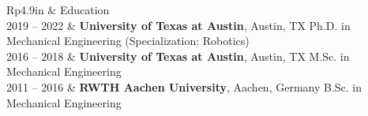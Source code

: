\documentclass[letterpaper, 11pt]{article}
\newcommand{\headingfont}{\Large\color{CustomBlue}}
\newenvironment{SectionTable}[1]{
	\renewcommand*{\arraystretch}{1.3} %
	\setlength{\tabcolsep}{10pt}
	\begin{longtable}{Rp{4.9in}} & #1 \\}
{\end{longtable}}
\begin{document}

\begin{SectionTable}{\headingfont Education}
2019 -- 2022 & 
\textbf{University of Texas at Austin}, Austin, TX \newline
Ph.D. in Mechanical Engineering (Specialization: Robotics) \\

2016 -- 2018 & 
\textbf{University of Texas at Austin}, Austin, TX \newline
M.Sc. in Mechanical Engineering \\ 

2011 -- 2016 & 
\textbf{RWTH Aachen University}, Aachen, Germany \newline
B.Sc. in Mechanical Engineering \\

\end{SectionTable}

\vspace{-0.8cm}

\end{document}
